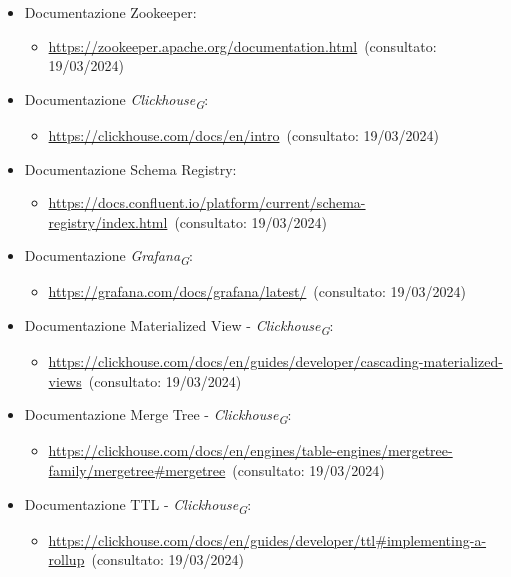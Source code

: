 \begin{itemize}
    \item Documentazione Zookeeper: 
    \begin{itemize}
        \item \url{https://zookeeper.apache.org/documentation.html}~(consultato: 19/03/2024)
    \end{itemize}
    \item Documentazione \textit{Clickhouse}\textsubscript{\textit{G}}: 
    \begin{itemize}
        \item \url{https://clickhouse.com/docs/en/intro}~(consultato: 19/03/2024)
    \end{itemize}
    \item Documentazione Schema Registry: 
    \begin{itemize}
        \item \url{https://docs.confluent.io/platform/current/schema-registry/index.html}~(consultato: 19/03/2024)
    \end{itemize}
    \item Documentazione \textit{Grafana}\textsubscript{\textit{G}}: 
    \begin{itemize}
        \item \url{https://grafana.com/docs/grafana/latest/}~(consultato: 19/03/2024)
    \end{itemize}
    \item Documentazione Materialized View - \textit{Clickhouse}\textsubscript{\textit{G}}: 
    \begin{itemize}
        \item \url{https://clickhouse.com/docs/en/guides/developer/cascading-materialized-views}~(consultato: 19/03/2024)
    \end{itemize}
    \item Documentazione Merge Tree - \textit{Clickhouse}\textsubscript{\textit{G}}: 
    \begin{itemize}
        \item \url{https://clickhouse.com/docs/en/engines/table-engines/mergetree-family/mergetree#mergetree}~(consultato: 19/03/2024)
    \end{itemize}
    \item Documentazione TTL - \textit{Clickhouse}\textsubscript{\textit{G}}: 
    \begin{itemize}
        \item \url{https://clickhouse.com/docs/en/guides/developer/ttl#implementing-a-rollup}~(consultato: 19/03/2024)
    \end{itemize}

\end{itemize}
